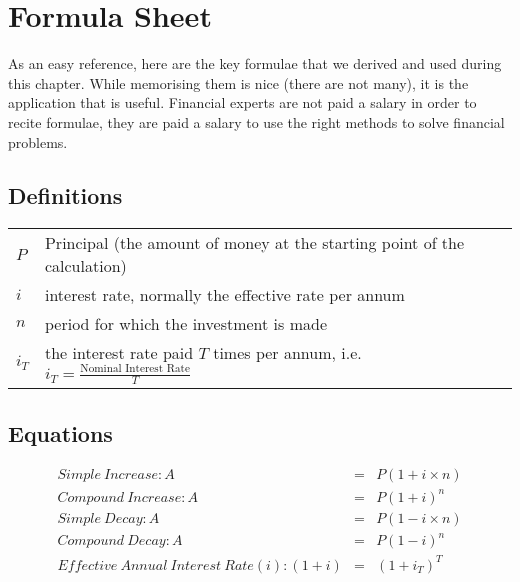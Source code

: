 
\section{Formula Sheet}
As an easy reference, here are the key formulae that we derived and used during this chapter. While memorising them is nice (there are not many), it is the application that is useful. Financial experts are not paid a salary in order to recite formulae, they are paid a salary to use the right methods to solve financial problems.

\subsection{Definitions}
\begin{tabular}{ll}
$P$ &Principal (the amount of money at the starting point of the calculation)\\
$i$ &interest rate, normally the effective rate per annum\\
$n$ &period for which the investment is made\\
$i_T$ &the interest rate paid $T$ times per annum, i.e. $i_T = \frac{\mbox{Nominal Interest Rate}}{T}$
\end{tabular}

\subsection{Equations}

\begin{eqnarray*}
Simple~ Increase: A &=& P(1 + i \times n)\\
Compound~ Increase: A &=& P(1 + i)^n\\
Simple~ Decay: A &=& P(1 - i \times n)\\
Compound~ Decay: A &=& P(1 - i)^n\\
Effective~ Annual~ Interest~ Rate (i):  (1 + i) &=& (1 + i_T)^T
\end{eqnarray*}

